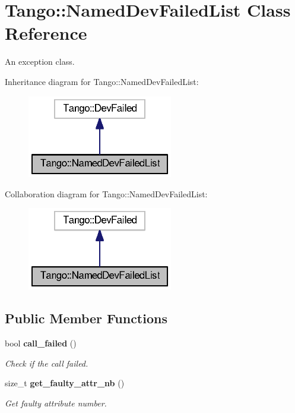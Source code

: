\section{Tango\-:\-:Named\-Dev\-Failed\-List Class Reference}
\label{classTango_1_1NamedDevFailedList}


An exception class.  




Inheritance diagram for Tango\-:\-:Named\-Dev\-Failed\-List\-:
\nopagebreak
\begin{figure}[H]
\begin{center}
\leavevmode
\includegraphics[width=180pt]{d8/dcc/classTango_1_1NamedDevFailedList__inherit__graph}
\end{center}
\end{figure}


Collaboration diagram for Tango\-:\-:Named\-Dev\-Failed\-List\-:
\nopagebreak
\begin{figure}[H]
\begin{center}
\leavevmode
\includegraphics[width=180pt]{d2/d33/classTango_1_1NamedDevFailedList__coll__graph}
\end{center}
\end{figure}
\subsection*{Public Member Functions}
\begin{DoxyCompactItemize}
\item 
bool {\bf call\-\_\-failed} ()
\begin{DoxyCompactList}\small\item\em Check if the call failed. \end{DoxyCompactList}\item 
size\-\_\-t {\bf get\-\_\-faulty\-\_\-attr\-\_\-nb} ()
\begin{DoxyCompactList}\small\item\em Get faulty attribute number. \end{DoxyCompactList}\end{DoxyCompactItemize}
